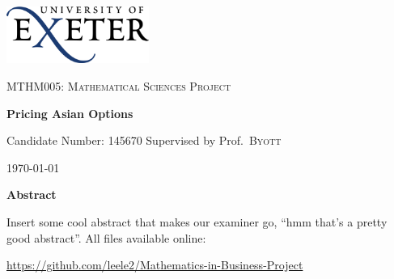 \begin{titlepage}
	\centering
	\includegraphics[width=0.35\textwidth]{Title/logo.png} \par
	\vspace{0.25cm}
	{\scshape\Large MTHM005: Mathematical Sciences Project\par}
	\vspace{0.5cm}
	{\huge\bfseries Pricing Asian Options\par}
    \vspace{0.10cm}
	{\Large Candidate Number: 145670}
	\vspace{0.2cm}
	\flushleft{}
	Supervised by	Prof.~\textsc{Byott} \hfill	{\large \today\par}
    \par
    \centering
	{\large \textbf{Abstract}}
	\par
    \lipsum[1]
    Insert some cool abstract that makes our examiner go, ``hmm that's a pretty good abstract''.
    \vfill
    All files available online: \par \small{\url{https://github.com/leele2/Mathematics-in-Business-Project}}
\end{titlepage}